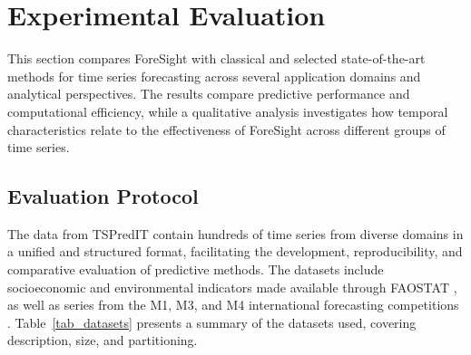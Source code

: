 \documentclass[final,3p,times,twocolumn,authoryear]{elsarticle}
\begin{document}
\section{Experimental Evaluation}
\label{sec_experiments}

This section compares ForeSight with classical and selected state-of-the-art methods for time series forecasting across several application domains and analytical perspectives. The results compare predictive performance and computational efficiency, while a qualitative analysis investigates how temporal characteristics relate to the effectiveness of ForeSight across different groups of time series.

\subsection{Evaluation Protocol}
\label{sec_protocol}

The data from TSPredIT contain hundreds of time series from diverse domains in a unified and structured format, facilitating the development, reproducibility, and comparative evaluation of predictive methods. The datasets include socioeconomic and environmental indicators made available through FAOSTAT \citep{fao_faostat_2024}, as well as series from the M1, M3, and M4 international forecasting competitions \citep{makridakis_accuracy_1982, makridakis_m3_2000, makridakis_m4_2020}. Table~\ref{tab_datasets} presents a summary of the datasets used, covering description, size, and partitioning.
\end{document}
